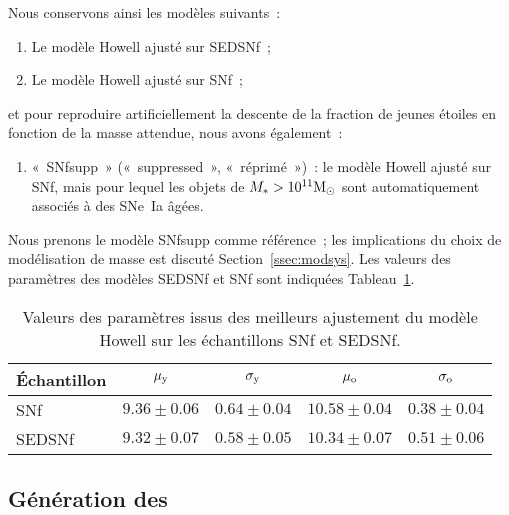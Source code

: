 \documentclass[../main/main.tex]{subfiles}
\begin{document}
Nous conservons ainsi les modèles suivants~:
\begin{enumerate}
    \item Le modèle Howell ajusté sur SEDSNf~;
    \item Le modèle Howell ajusté sur SNf~;
\end{enumerate}
et pour reproduire artificiellement la descente de la fraction de jeunes étoiles
en fonction de la masse attendue, nous avons également~:
\begin{enumerate}[resume]
    \item «~SNfsupp~» («~suppressed~», «~réprimé~»)~: le modèle Howell ajusté
        sur SNf, mais pour lequel les objets de $M_* > 10^{11}\si{\Msun}$ sont
        automatiquement associés à des SNe~Ia âgées.
\end{enumerate}

Nous prenons le modèle SNfsupp comme référence~; les implications du choix de
modélisation de masse est discuté Section~\ref{ssec:modsys}. Les valeurs des
paramètres des modèles SEDSNf et SNf sont indiquées
Tableau~\ref{tab:massmodelresults}.

\begin{table}[ht]
    \centerfloat
    \caption[Valeurs des paramètres issus des meilleurs ajustement du modèle
    Howell sur les échantillons SNf et SEDSNf]{Valeurs des paramètres issus des
    meilleurs ajustement du modèle Howell sur les échantillons SNf et SEDSNf.}
    \label{tab:massmodelresults}
    \begin{tabular}{lcccc}
        \toprule
        Échantillon              &
                $\mu_{\rm y} $   &
                $\sigma_{\rm y}$ &
                $\mu_{\rm o} $   &
                $\sigma_{\rm o}$ \\
        \midrule
        SNf    & $9.36  \pm 0.06$
               & $0.64  \pm 0.04$
               & $10.58 \pm 0.04$
               & $0.38  \pm 0.04$
               \\
        SEDSNf & $9.32  \pm 0.07$
               & $0.58  \pm 0.05$
               & $10.34 \pm 0.07$
               & $0.51  \pm 0.06$
               \\
        \bottomrule
    \end{tabular}
\end{table}

\subsection{Génération des \hostlib}\label{ssec:inpgen}
\end{document}

